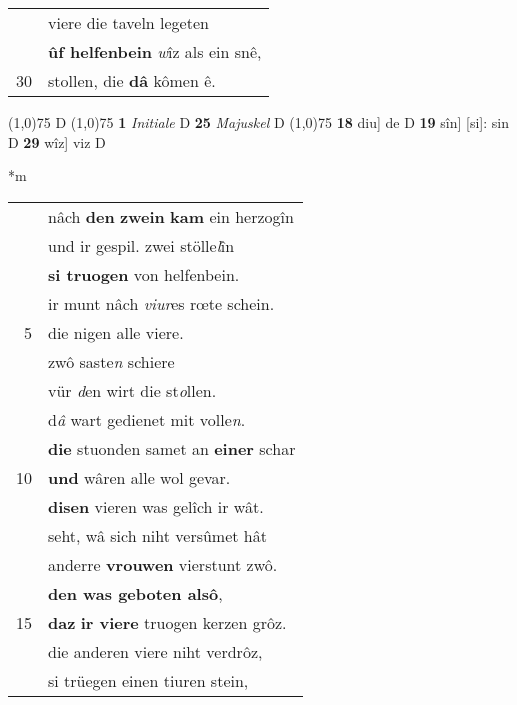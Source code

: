 \documentclass[8pt,a4paper,notitlepage]{article}
\begin{document}
\begin{table}[ht]
\begin{minipage}[t]{0.5\linewidth}
\begin{tabular}{rl}
 & viere die taveln legeten\\ 
 & \textbf{ûf helfenbein} \textit{w}îz als ein snê,\\ 
30 & stollen, die \textbf{dâ} kômen ê.\\ 
\end{tabular}
\scriptsize
\line(1,0){75} \newline
D \newline
\line(1,0){75} \newline
\textbf{1} \textit{Initiale} D  \textbf{25} \textit{Majuskel} D  \newline
\line(1,0){75} \newline
\textbf{18} diu] de D \textbf{19} sîn] [si]: sin D \textbf{29} wîz] viz D \newline
\end{minipage}
\hspace{0.5cm}
\begin{minipage}[t]{0.5\linewidth}
\small
\begin{center}*m
\end{center}
\begin{tabular}{rl}
 & nâch \textbf{den} \textbf{zwein} \textbf{kam} ein herzogîn\\ 
 & und ir gespil. zwei stölle\textit{l}în\\ 
 & \textbf{si truogen} von helfenbein.\\ 
 & ir munt nâch \textit{viur}es rœte schein.\\ 
5 & die nigen alle viere.\\ 
 & zwô saste\textit{n} schiere\\ 
 & vür \textit{d}en wirt die st\textit{o}llen.\\ 
 & d\textit{â} wart gedienet mit volle\textit{n}.\\ 
 & \textbf{die} stuonden samet an \textbf{einer} schar\\ 
10 & \textbf{und} wâren alle wol gevar.\\ 
 & \textbf{disen} vieren was gelîch ir wât.\\ 
 & seht, wâ sich niht versûmet hât\\ 
 & anderre \textbf{vrouwen} vierstunt zwô.\\ 
 & \textbf{den was geboten alsô},\\ 
15 & \textbf{daz} \textbf{ir viere} truogen kerzen grôz.\\ 
 & die anderen viere niht verdrôz,\\ 
 & si trüegen einen tiuren stein,\\ 

\end{tabular}
\end{minipage}
\end{table}
\end{document}

